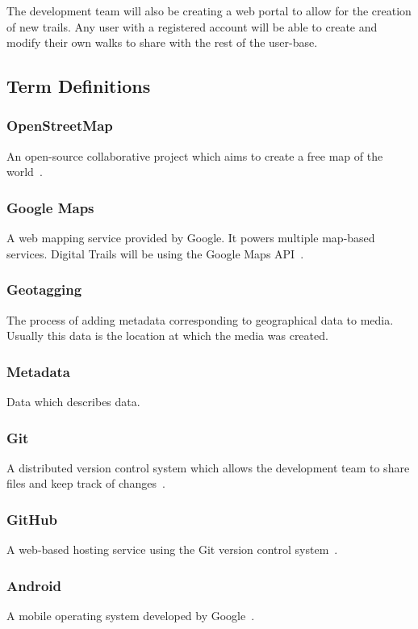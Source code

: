\documentclass[11pt,a4paper]{article}
\begin{document}
The development team will also be creating a web portal to allow for the creation of new trails. Any user with a registered account will be able to create and modify their own walks to share with the rest of the user-base.

\subsection{Term Definitions}
\label{sec:terms}

\subsubsection{OpenStreetMap}
An open-source collaborative project which aims to create a free map of the world~\cite{OSM}.

\subsubsection{Google Maps}
A web mapping service provided by Google. It powers multiple map-based services. Digital Trails will be using the Google Maps API~\cite{googleAPI}.

\subsubsection{Geotagging}
The process of adding metadata corresponding to geographical data to media. Usually this data is the location at which the media was created.

\subsubsection{Metadata}
Data which describes data.

\subsubsection{Git}
A distributed version control system which allows the development team to share files and keep track of changes~\cite{git}.

\subsubsection{GitHub}
A web-based hosting service using the Git version control system~\cite{github}.

\subsubsection{Android}
A mobile operating system developed by Google~\cite{android}. 
\end{document}
